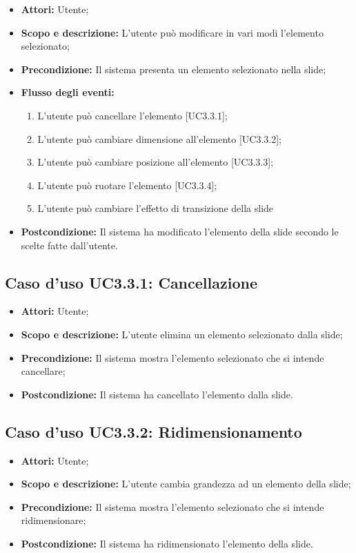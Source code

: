 \begin{itemize}
	\item \textbf{Attori:} Utente;
	\item \textbf{Scopo e descrizione:} L'utente può modificare in vari modi l'elemento selezionato;
	\item \textbf{Precondizione:} Il sistema presenta un elemento selezionato nella slide;
	\item \textbf{Flusso degli eventi:}
	\begin{enumerate}
		\item L'utente può cancellare l'elemento [UC3.3.1];
		\item L'utente può cambiare dimensione all'elemento [UC3.3.2];
		\item L'utente può cambiare posizione all'elemento [UC3.3.3];
		\item L'utente può ruotare l'elemento [UC3.3.4];
		\item L'utente può cambiare l'effetto di transizione della slide
	\end{enumerate}
	\item \textbf{Postcondizione:} Il sistema ha modificato l'elemento della slide secondo le scelte fatte dall'utente.
\end{itemize}

\subsection{Caso d'uso UC3.3.1: Cancellazione}
\begin{itemize}
	\item \textbf{Attori:} Utente;
	\item \textbf{Scopo e descrizione:} L'utente elimina un elemento selezionato dalla slide;
	\item \textbf{Precondizione:} Il sistema mostra l'elemento selezionato che si intende cancellare;
	\item \textbf{Postcondizione:} Il sistema ha cancellato l'elemento dalla slide.
\end{itemize}

\subsection{Caso d'uso UC3.3.2: Ridimensionamento}
\begin{itemize}
	\item \textbf{Attori:} Utente;
	\item \textbf{Scopo e descrizione:} L'utente cambia grandezza ad un elemento della slide;
	\item \textbf{Precondizione:} Il sistema mostra l'elemento selezionato che si intende ridimensionare;
	\item \textbf{Postcondizione:} Il sistema ha ridimensionato l'elemento della slide.
\end{itemize}

